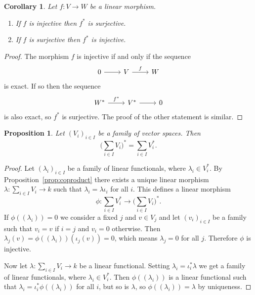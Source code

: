 \documentclass[11pt]{article}
\newtheorem{prop}[theo]{Proposition}
\newtheorem{coro}[theo]{Corollary}
\theoremstyle{definition}
\begin{document}
\begin{coro}
Let $f : V \to W$ be a linear morphism.
\begin{enumerate}
\item
If $f$ is injective then $f^*$ is surjective.

\item
If $f$ is surjective then $f^*$ is injective.
\end{enumerate}
\end{coro}

\begin{proof}
The morphism $f$ is injective if and only if the sequence
\[
\begin{tikzcd}
0 \ar[r] & V \ar[r,"f"] & W
\end{tikzcd}
\]
is exact.
If so then the sequence
\[
\begin{tikzcd}
W^* \ar[r,"f^*"] & V^* \ar[r] & 0
\end{tikzcd}
\]
is also exact, so $f^*$ is surjective.
The proof of the other statement is similar.
\end{proof}



\begin{prop}
Let $(V_i)_{i \in I}$ be a family of vector spaces.
Then
\[
\biggl( \sum_{i \in I} V_i \biggr)^* \!\! =
\sum_{i \in I} V_i^*.
\]
\end{prop}

\begin{proof}
Let $(\lambda_i)_{i \in I}$ be a family of linear functionals, where $\lambda_i \in V_i^*$.
By Proposition~\ref{prop:coproduct} there exists a unique linear morphism $\lambda : \sum_{i \in I} V_i \to k$ such that $\lambda_i = \lambda \iota_i$ for all $i$.
This defines a linear morphism
\[
\phi : \sum_{i \in I} V_i^* \longrightarrow
\biggl( \sum_{i \in I} V_i \biggr)^*.
\]
If $\phi((\lambda_i)) = 0$ we consider a fixed $j$ and $v \in V_j$ and let $(v_i)_{i \in I}$ be a family such that $v_i = v$ if $i = j$ and $v_i = 0$ otherwise.
Then $\lambda_j(v) = \phi((\lambda_i))(\iota_j(v)) = 0$, which means $\lambda_j = 0$ for all $j$.
Therefore $\phi$ is injective.

Now let $\lambda : \sum_{i \in I} V_i \to k$ be a linear functional.
Setting $\lambda_i = \iota_i^*\lambda$ we get a family of linear functionals, where $\lambda_i \in V_i^*$.
Then $\phi((\lambda_i))$ is a linear functional such that $\lambda_i = \iota_i^* \phi((\lambda_i))$ for all $i$, but so is $\lambda$, so $\phi((\lambda_i)) = \lambda$ by uniqueness.
\end{proof}
\end{document}
